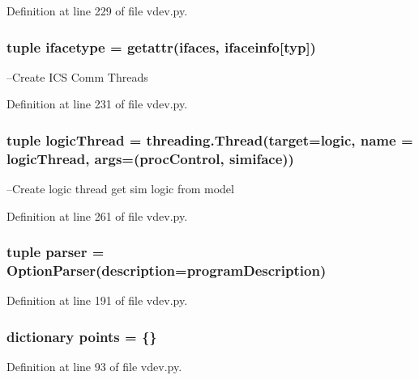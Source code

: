 Definition at line 229 of file vdev.\+py.

\subsubsection[{ifacetype}]{\setlength{\rightskip}{0pt plus 5cm}tuple ifacetype = getattr(ifaces, {\bf ifaceinfo}[\textquotesingle{}typ\textquotesingle{}])}\label{namespacevdev_a950818cc38f4260289120c43e343ddca}


--Create I\+C\+S Comm Threads 



Definition at line 231 of file vdev.\+py.

\subsubsection[{logic\+Thread}]{\setlength{\rightskip}{0pt plus 5cm}tuple logic\+Thread = threading.\+Thread(target={\bf logic}, {\bf name} = \textquotesingle{}logic\+Thread\textquotesingle{}, args=(proc\+Control, {\bf simiface}))}\label{namespacevdev_aa1e988777ef792fd2b0954a4e9700fc6}


--Create logic thread get sim logic from model 



Definition at line 261 of file vdev.\+py.

\subsubsection[{parser}]{\setlength{\rightskip}{0pt plus 5cm}tuple parser = Option\+Parser(description={\bf program\+Description})}\label{namespacevdev_a8842070e9da559035fb0c7cd5f8b3c6e}


Definition at line 191 of file vdev.\+py.

\subsubsection[{points}]{\setlength{\rightskip}{0pt plus 5cm}dictionary points = \{\}}\label{namespacevdev_a59607ced87c32fb4bba0c6981bbcf9a0}


Definition at line 93 of file vdev.\+py.

